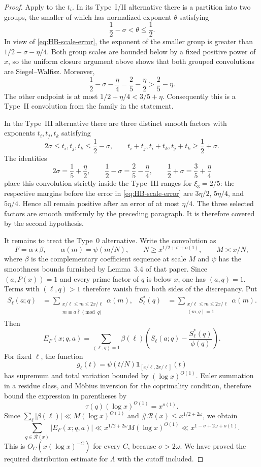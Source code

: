 \documentclass[11pt,reqno]{amsart}
\theoremstyle{definition}
\theoremstyle{remark}
\numberwithin{equation}{section}
\newcommand{\ind}{\mathbf 1}
\begin{document}
\begin{proof}
Apply \cite[Lemma~3.1]{PolymathDistribution} to the $t_i$.  In its
Type~I/II alternative there is a partition into two groups, the smaller
of which has normalized exponent $\theta$ satisfying
\[
 \frac12-\sigma<\theta\le\frac12.
\]
In view of \eqref{eq:HB-scale-error}, the exponent of the smaller group
is greater than $1/2-\sigma-\eta/4$. Both group scales are bounded below
by a fixed positive power of $x$, so the uniform closure argument above
shows that both grouped convolutions are Siegel--Walfisz. Moreover,
\[
 \frac12-\sigma-\frac\eta4
   =\frac25-\frac\eta2>\frac25-\eta.
\]
The other endpoint is at most $1/2+\eta/4<3/5+\eta$.
Consequently this is a Type~II convolution from the family in the
statement.

In the Type~III alternative there are three distinct smooth factors
with exponents $t_i,t_j,t_k$ satisfying
\[
 2\sigma\le t_i,t_j,t_k\le\frac12-\sigma,
 \qquad t_i+t_j,t_i+t_k,t_j+t_k\ge\frac12+\sigma.
\]
The identities
\[
 2\sigma=\frac15+\frac\eta2,\qquad
 \frac12-\sigma=\frac25-\frac\eta4,\qquad
 \frac12+\sigma=\frac35+\frac\eta4
\]
place this convolution strictly inside the Type~III ranges for
$\xi_3=2/5$: the respective margins before the error in
\eqref{eq:HB-scale-error} are $3\eta/2$, $5\eta/4$, and $5\eta/4$.
Hence all remain positive after an error of at most $\eta/4$. The three
selected factors are smooth uniformly by the preceding paragraph. It is therefore covered
by the second hypothesis.

It remains to treat the Type~0 alternative. Write the convolution as
\[
 F=\alpha\star\beta,\qquad
 \alpha(m)=\psi(m/N),\qquad
 N\ge x^{1/2+\sigma+o(1)},\qquad M\asymp x/N,
\]
where $\beta$ is the complementary coefficient sequence at scale $M$ and
$\psi$ has the smoothness bounds furnished by Lemma~3.4 of that paper.
Since $(a,P(x))=1$ and every prime factor of $q$ is below $x$, one has
$(a,q)=1$. Terms with $(\ell,q)>1$ therefore vanish from both sides of
the discrepancy. Put
\begin{align*}
 S_\ell(a;q)&=
 \sum_{\substack{x/\ell\le m\le2x/\ell\\
                  m\equiv a\bar\ell\pmod q}}\alpha(m),&
 S_\ell^*(q)&=
 \sum_{\substack{x/\ell\le m\le2x/\ell\\(m,q)=1}}\alpha(m).
\end{align*}
Then
\[
 E_F(x;q,a)=\sum_{(\ell,q)=1}\beta(\ell)
 \left(S_\ell(a;q)-\frac{S_\ell^*(q)}{\phi(q)}\right).
\]
For fixed $\ell$, the function
\[
 g_\ell(t)=\psi(t/N)\ind_{[x/\ell,2x/\ell]}(t)
\]
has supremum and total variation bounded by $(\log x)^{O(1)}$.
Euler summation in a residue class, and M\"obius inversion for the
coprimality condition, therefore bound the expression in parentheses by
\[
 \tau(q)(\log x)^{O(1)}=x^{o(1)}.
\]
Since $\sum_\ell|\beta(\ell)|\ll M(\log x)^{O(1)}$ and
$\#\mathcal R(x)\le x^{1/2+2\omega}$, we obtain
\[
 \sum_{q\in\mathcal R(x)}|E_F(x;q,a)|
 \ll x^{1/2+2\omega}M(\log x)^{O(1)}
 \ll x^{1-\sigma+2\omega+o(1)}.
\]
This is $O_C(x(\log x)^{-C})$ for every $C$, because
$\sigma>2\omega$. We have proved the required distribution estimate for
$\Lambda$ with the cutoff included.


\end{proof}
\end{document}
